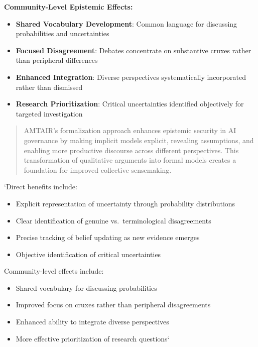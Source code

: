 \documentclass[
  11pt,
  letterpaper,
]{book}
\providecommand{\tightlist}{%
  \setlength{\itemsep}{0pt}\setlength{\parskip}{0pt}}
\begin{document}
\textbf{Community-Level Epistemic Effects:}

\begin{itemize}
\tightlist
\item
  \textbf{Shared Vocabulary Development}: Common language for discussing
  probabilities and uncertainties
\item
  \textbf{Focused Disagreement}: Debates concentrate on substantive
  cruxes rather than peripheral differences
\item
  \textbf{Enhanced Integration}: Diverse perspectives systematically
  incorporated rather than dismissed
\item
  \textbf{Research Prioritization}: Critical uncertainties identified
  objectively for targeted investigation
\end{itemize}

\begin{quote}
AMTAIR's formalization approach enhances epistemic security in AI
governance by making implicit models explicit, revealing assumptions,
and enabling more productive discourse across different perspectives.
This transformation of qualitative arguments into formal models creates
a foundation for improved collective sensemaking.
\end{quote}

`Direct benefits include:

\begin{itemize}
\tightlist
\item
  Explicit representation of uncertainty through probability
  distributions
\item
  Clear identification of genuine vs.~terminological disagreements
\item
  Precise tracking of belief updating as new evidence emerges
\item
  Objective identification of critical uncertainties
\end{itemize}

Community-level effects include:

\begin{itemize}
\tightlist
\item
  Shared vocabulary for discussing probabilities
\item
  Improved focus on cruxes rather than peripheral disagreements
\item
  Enhanced ability to integrate diverse perspectives
\item
  More effective prioritization of research questions`
\end{itemize}
\end{document}
